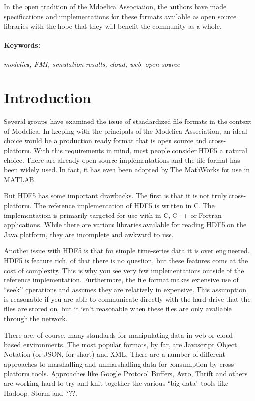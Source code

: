 \documentclass[11pt,a4paper,onecolumn]{article}
\begin{document}
In the open tradition of the Mdoelica Association, the authors have
made specifications and implementations for these formats available as
open source libraries with the hope that they will benefit the
community as a whole.

\paragraph{Keywords:}\emph{modelica, FMI, simulation results,
  cloud, web, open source}

\section{Introduction}
\label{sec:intro}

Several groups have examined the issue of standardized file formats
\cite{AndreasHDF5,GallHDF5} in the context of Modelica.  In keeping
with the principals of the Modelica Association, an ideal choice would
be a production ready format that is open source and cross-platform.
With this requirements in mind, most people consider HDF5 a natural
choice.  There are already open source implementations and the file
format has been widely used.  In fact, it has even been adopted by The
MathWorks for use in MATLAB.

But HDF5 has some important drawbacks.  The first is that it is not
truly cross-platform.  The reference implementation of HDF5 is written
in C.  The implementation is primarily targeted for use with in C, C++
or Fortran applications.  While there are various libraries available
for reading HDF5 on the Java platform\cite{HDFJava}, they are
incomplete and awkward to use.

Another issue with HDF5 is that for simple time-series data it is over
engineered.  HDF5 is feature rich, of that there is no question, but
these features come at the cost of complexity.  This is why you see
very few implementations outside of the reference implementation.
Furthermore, the file format makes extensive use of ``seek''
operations and assumes they are relatively in expensive.  This
assumption is reasonable if you are able to communicate directly with
the hard drive that the files are stored on, but it isn't reasonable
when these files are only available through the network.

There are, of course, many standards for manipulating data in web or
cloud based environments.  The most popular formats, by far, are
Javascript Object Notation (or JSON, for short) and XML.  There are a
number of different approaches to marshalling and unmarshalling data
for consumption by cross-platform tools.  Approaches like Google
Protocol Buffers\cite{GPB}, Avro\cite{Avro}, Thrift\cite{Thrift} and
others are working hard to try and knit together the various ``big
data'' tools like Hadoop\cite{Hadoop}, Storm\cite{Storm} and ???.
\end{document}
